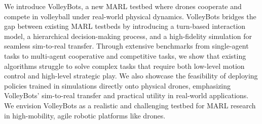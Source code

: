 We introduce VolleyBots, a new MARL testbed where drones cooperate and compete in volleyball under real-world physical dynamics. VolleyBots bridges the gap between existing MARL testbeds by introducing a turn-based interaction model, a hierarchical decision-making process, and a high-fidelity simulation for seamless sim-to-real transfer. Through extensive benchmarks from single-agent tasks to multi-agent cooperative and competitive tasks, we show that existing algorithms struggle to solve complex tasks that require both low-level motion control and high-level strategic play. We also showcase the feasibility of deploying policies trained in simulations directly onto physical drones, emphasizing VolleyBots' sim-to-real transfer and practical utility in real-world applications. We envision VolleyBots as a realistic and challenging testbed for MARL research in high-mobility, agile robotic platforms like drones.
